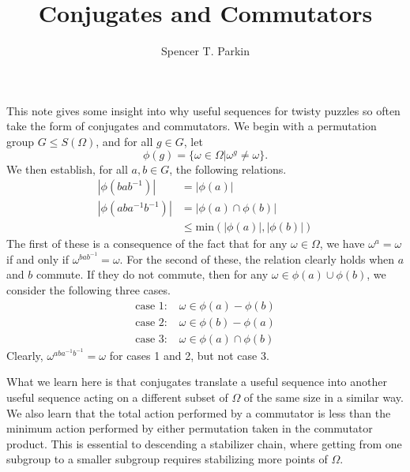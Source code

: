 \documentclass[12pt]{article}
\title{Conjugates and Commutators}
\author{Spencer T. Parkin}
\begin{document}
\maketitle

This note gives some insight into why useful sequences for twisty puzzles so often take
the form of conjugates and commutators.  We begin with a permutation group $G\leq S(\Omega)$,
and for all $g\in G$, let
\begin{equation*}
\phi(g)=\{\omega\in\Omega|\omega^g\neq\omega\}.
\end{equation*}
We then establish, for all $a,b\in G$, the following relations.
\begin{align*}
|\phi(bab^{-1})|&=|\phi(a)|\\
|\phi(aba^{-1}b^{-1})|&=|\phi(a)\cap\phi(b)|\\
 &\leq\mbox{min}(|\phi(a)|,|\phi(b)|)
\end{align*}
The first of these is a consequence of the fact that for any $\omega\in\Omega$, we
have $\omega^a=\omega$ if and only if $\omega^{bab^{-1}}=\omega$.
For the second of these, the relation clearly holds when $a$ and $b$ commute.
If they do not commute, then for any $\omega\in\phi(a)\cup\phi(b)$,
we consider the following three cases.
\begin{align*}
\mbox{case 1:}\; & \omega\in\phi(a)-\phi(b)\\
\mbox{case 2:}\; & \omega\in\phi(b)-\phi(a)\\
\mbox{case 3:}\; & \omega\in\phi(a)\cap\phi(b)
\end{align*}
Clearly, $\omega^{aba^{-1}b^{-1}}=\omega$ for cases 1 and 2, but not case 3.

What we learn here is that conjugates translate a useful sequence into another useful
sequence acting on a different subset of $\Omega$ of the same size in a similar way.
We also learn that the total action performed by a commutator is less than the minimum
action performed by either permutation taken in the commutator product.  This is
essential to descending a stabilizer chain, where getting from one subgroup to a
smaller subgroup requires stabilizing more points of $\Omega$.
\end{document}
